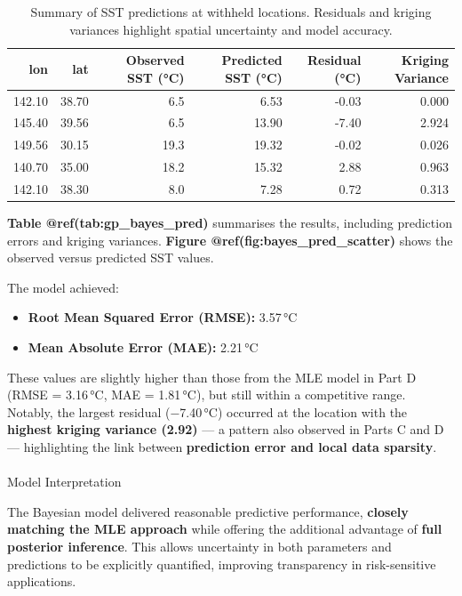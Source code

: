 \documentclass[
  11pt,
]{article}
\makeatletter
\let\oldparagraph\paragraph
\renewcommand{\paragraph}{
    \@ifstar
      \xxxParagraphStar
      \xxxParagraphNoStar
  }
\newcommand{\xxxParagraphStar}[1]{\oldparagraph*{#1}\mbox{}}
\newcommand{\xxxParagraphNoStar}[1]{\oldparagraph{#1}\mbox{}}
\makeatother
\begin{document}
\begin{table}

\caption{Summary of SST predictions at withheld locations. Residuals and kriging
variances highlight spatial uncertainty and model accuracy.}
\centering
\begin{tabular}[t]{rrrrrr}
\toprule
lon & lat & Observed SST (°C) & Predicted SST (°C) & Residual (°C) & Kriging Variance\\
\midrule
142.10 & 38.70 & 6.5 & 6.53 & -0.03 & 0.000\\
145.40 & 39.56 & 6.5 & 13.90 & -7.40 & 2.924\\
149.56 & 30.15 & 19.3 & 19.32 & -0.02 & 0.026\\
140.70 & 35.00 & 18.2 & 15.32 & 2.88 & 0.963\\
142.10 & 38.30 & 8.0 & 7.28 & 0.72 & 0.313\\
\bottomrule
\end{tabular}
\end{table}

\textbf{Table @ref(tab:gp\_bayes\_pred)} summarises the results,
including prediction errors and kriging variances. \textbf{Figure
@ref(fig:bayes\_pred\_scatter)} shows the observed versus predicted SST
values.

The model achieved:

\begin{itemize}
\item
  \textbf{Root Mean Squared Error (RMSE):} 3.57\,°C
\item
  \textbf{Mean Absolute Error (MAE):} 2.21\,°C
\end{itemize}

These values are slightly higher than those from the MLE model in Part D
(RMSE = 3.16\,°C, MAE = 1.81\,°C), but still within a competitive range.
Notably, the largest residual (−7.40\,°C) occurred at the location with
the \textbf{highest kriging variance (2.92)} --- a pattern also observed
in Parts C and D --- highlighting the link between \textbf{prediction
error and local data sparsity}.

\paragraph{Model Interpretation}\label{model-interpretation}

The Bayesian model delivered reasonable predictive performance,
\textbf{closely matching the MLE approach} while offering the additional
advantage of \textbf{full posterior inference}. This allows uncertainty
in both parameters and predictions to be explicitly quantified,
improving transparency in risk-sensitive applications.
\end{document}
